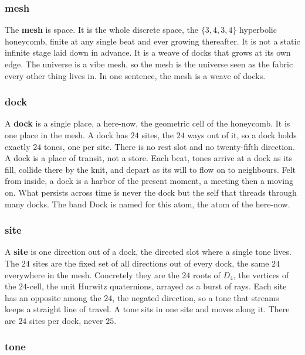 \subsubsection{mesh}

The \textbf{mesh} is space. It is the whole discrete space, the $\{3,4,3,4\}$ hyperbolic honeycomb, finite at any single beat and ever growing thereafter. It is not a static infinite stage laid down in advance. It is a weave of docks that grows at its own edge. The universe is a vibe mesh, so the mesh is the universe seen as the fabric every other thing lives in. In one sentence, the mesh is a weave of docks.

\subsubsection{dock}

A \textbf{dock} is a single place, a here-now, the geometric cell of the honeycomb. It is one place in the mesh. A dock has $24$ sites, the $24$ ways out of it, so a dock holds exactly $24$ tones, one per site. There is no rest slot and no twenty-fifth direction. A dock is a place of transit, not a store. Each beat, tones arrive at a dock as its fill, collide there by the knit, and depart as its will to flow on to neighbours. Felt from inside, a dock is a harbor of the present moment, a meeting then a moving on. What persists across time is never the dock but the self that threads through many docks. The band Dock is named for this atom, the atom of the here-now.

\subsubsection{site}

A \textbf{site} is one direction out of a dock, the directed slot where a single tone lives. The $24$ sites are the fixed set of all directions out of every dock, the same $24$ everywhere in the mesh. Concretely they are the $24$ roots of $D_4$, the vertices of the $24$-cell, the unit Hurwitz quaternions, arrayed as a burst of rays. Each site has an opposite among the $24$, the negated direction, so a tone that streams keeps a straight line of travel. A tone sits in one site and moves along it. There are $24$ sites per dock, never $25$.

\subsubsection{tone}

